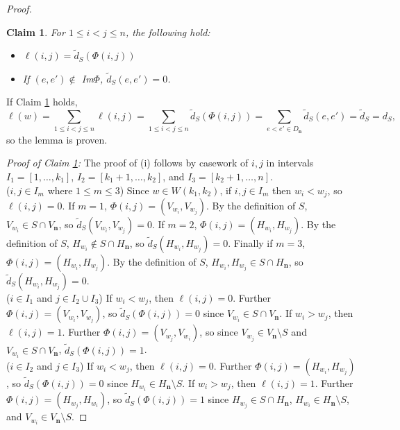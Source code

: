 \documentclass{amsart}
\newtheorem{clm}{Claim}
\newcommand{\bfn}{\mathbf{n}}
\begin{document}
\begin{proof}
\begin{clm}\label{clm:pairMatch}
For $1\leq i<j\leq n$,  the following hold:
\begin{itemize}
    \item[(i)] $\ell(i,j)=\widetilde{d}_S(\Phi(i,j))$
    \item[(ii)] If $(e,e')\not\in$ Im$\Phi$, $\widetilde{d}_S(e,e')=0$.
\end{itemize}
\end{clm}

If Claim \ref{clm:pairMatch} holds, \[\ell(w)=\sum\limits_{1\leq i<j\leq n} \ell(i,j)=\sum\limits_{1\leq i<j\leq n} \widetilde{d}_S(\Phi(i,j))=\sum\limits_{e<e'\in D_\bfn} \widetilde{d}_S(e,e')=\widetilde{d}_S={d}_S,\]
so the lemma is proven.


\noindent\emph{Proof of Claim \ref{clm:pairMatch}:}
The proof of (i) follows by casework of $i,j$ in intervals $I_1=[1,\ldots,k_1]$, $I_2=[k_1+1,\ldots,k_2]$, and $I_3=[k_2+1,\ldots,n]$.\\ 

($i,j\in I_m$ where $1\leq m\leq 3$) 
Since $w\in W(k_1,k_2)$, if $i,j\in I_m$ then $w_i<w_j$, so $\ell(i,j)=0$. 
If $m=1$, $\Phi(i,j)=(V_{w_i},V_{w_j})$. By the definition of $S$, $V_{w_i}\in S\cap V_\bfn$, so 
$\widetilde{d}_S(V_{w_i},V_{w_j})=0$.
If $m=2$, $\Phi(i,j)=(H_{w_i},H_{w_j})$. By the definition of $S$, $H_{w_i}\not\in S\cap H_\bfn$, so 
$\widetilde{d}_S(H_{w_i},H_{w_j})=0$.
Finally if $m=3$, $\Phi(i,j)=(H_{w_i},H_{w_j})$. By the definition of $S$, $H_{w_i},H_{w_j}\in S\cap H_\bfn$, so 
$\widetilde{d}_S(H_{w_i},H_{w_j})=0$.\\


($i\in I_1$ and $j\in I_{2}\cup I_3$)
If $w_i<w_j$, then $\ell(i,j)=0$.
Further $\Phi(i,j)=(V_{w_i},V_{w_j})$, so 
$\widetilde{d}_S(\Phi(i,j))=0$ since $V_{w_i}\in S\cap V_\bfn$.
If $w_i>w_j$, then $\ell(i,j)=1$.
Further $\Phi(i,j)=(V_{w_j},V_{w_i})$, so since $V_{w_j}\in V_\bfn\setminus S$ and $V_{w_i}\in S\cap V_\bfn$,
$\widetilde{d}_S(\Phi(i,j))=1$.\\

($i\in I_2$ and $j\in I_{3}$)
If $w_i<w_j$, then $\ell(i,j)=0$.
Further $\Phi(i,j)=(H_{w_i},H_{w_j})$, so 
$\widetilde{d}_S(\Phi(i,j))=0$ since $H_{w_i}\in H_\bfn\setminus S$.
If $w_i>w_j$, then $\ell(i,j)=1$.
Further $\Phi(i,j)=(H_{w_j},H_{w_i})$, so 
$\widetilde{d}_S(\Phi(i,j))=1$ since $H_{w_j}\in S\cap H_\bfn$, $H_{w_i}\in H_\bfn\setminus S$, and $V_{w_i}\in V_\bfn\setminus S$.



\end{proof}
\end{document}
